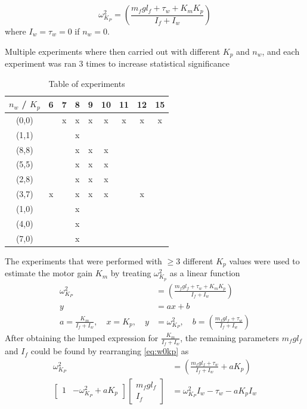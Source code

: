 \documentclass[12pt]{article}
\begin{document}
\begin{equation}
\omega_{K_P}^2  = \left(\frac{m_fgl_f+\tau_w+K_mK_p}{I_f + I_w}\right)
\label{eq:w0kp}
\end{equation}
where $I_w=\tau_w = 0$ if $n_w = 0$. 

Multiple experiments where then carried out with different $K_p$ and $n_w$, and each experiment was ran 3 times to increase statistical significance
\begin{table}
\caption{Table of experiments}
\label{tab:exp}
\begin{center}
\begin{tabular}{c|c|c|c|c|c|c|c|c}
$n_w$ / $K_p$ & 6 & 7 & 8 & 9 & 10 & 11 & 12 & 15 \\ \hline 
(0,0) &   & x & x & x & x & x & x & x\\
(1,1) &   &   & x &   &   &   &   &  \\
(8,8) &   &   & x & x & x &   &   &  \\
(5,5) &   &   & x & x & x &   &   &  \\
(2,8) &   &   & x & x & x &   &   &  \\
(3,7) & x &   & x & x & x &   & x &  \\
(1,0) &   &   & x &   &   &   &   &  \\
(4,0) &   &   & x &   &   &   &   &  \\
(7,0) &   &   & x &   &   &   &   &  
\end{tabular}
\end{center}
\end{table}
The experiments that were performed with $\geq 3$ different $K_p$ values were used to estimate the motor gain $K_m$ by treating $\omega_{K_p}^2$ as a linear function
\begin{equation}
\begin{split}
\omega_{K_P}^2  &= \left(\frac{m_fgl_f+\tau_w+K_mK_p}{I_f + I_w}\right)\\
 y &= ax + b \\
 a = \frac{K_m}{I_f+I_w}, \quad x = K_p, \quad y &= \omega_{K_P}^2, \quad b = \left(\frac{m_fgl_f+\tau_w}{I_f + I_w}\right)
\end{split}
\end{equation}
After obtaining the lumped expression for $\frac{K_m}{I_f+I_w}$, the remaining parameters $m_fgl_f$ and $I_f$ could be found by rearranging \eqref{eq:w0kp} as
\begin{equation}
\begin{split}
\omega_{K_P}^2  &= \left(\frac{m_fgl_f+\tau_w}{I_f + I_w} + aK_p\right)\\
\begin{bmatrix}
1 & -\omega_{K_P}^2 + aK_p 
\end{bmatrix}
\begin{bmatrix}
m_fgl_f \\
I_f
\end{bmatrix}
&=
\omega_{K_P}^2I_w-\tau_w-aK_pI_w 
\end{split}
\end{equation}
\end{document}
